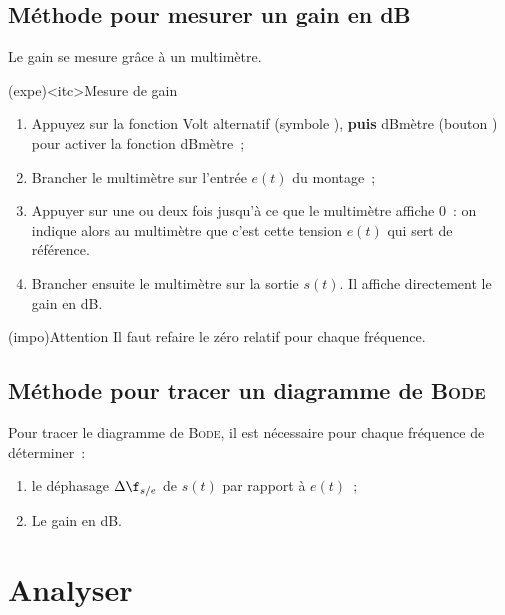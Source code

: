 \documentclass[../main/main.tex]{subfiles}
\begin{document}
{	\subsection{Méthode pour mesurer un gain en dB}

	Le gain se mesure grâce à un multimètre.
	\begin{tcb}(expe)<itc>{Mesure de gain}
		\begin{enumerate}
      \item Appuyez sur la fonction Volt alternatif (symbole
            ), \textbf{puis} dBmètre (bouton ) pour
            activer la fonction dBmètre~;
			\item Brancher le multimètre sur l'entrée $e(t)$ du montage~;
			\item Appuyer sur  une ou deux fois jusqu'à ce que le
			      multimètre affiche 0~: on indique alors au multimètre que c'est cette
			      tension $e(t)$ qui sert de référence.
			\item Brancher ensuite le multimètre sur la sortie $s(t)$. Il affiche
			      directement le gain en dB.
		\end{enumerate}
		\begin{center}
			\begin{tcb}[cnt, bld, width=.8\linewidth](impo){Attention}
				Il faut refaire le zéro relatif pour chaque fréquence.
			\end{tcb}
		\end{center}
	\end{tcb}

	\subsection{Méthode pour tracer un diagramme de \textsc{Bode}}

	Pour tracer le diagramme de \textsc{Bode}, il est nécessaire pour chaque
	fréquence de déterminer~:
	\begin{enumerate}
		\item le déphasage $\Delta\f_{s/e}$ de $s(t)$ par rapport à $e(t)$~;
		\item Le gain en dB.
	\end{enumerate}
}

\setcounter{section}{2}
\section{Analyser}
\end{document}
